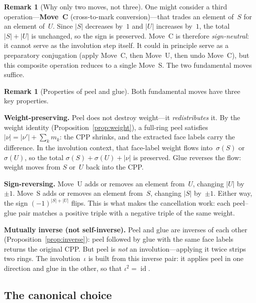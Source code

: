 \documentclass[11pt]{article}
\theoremstyle{plain}
\theoremstyle{definition}
\newtheorem{remark}[theorem]{Remark}
\begin{document}
\begin{remark}[Why only two moves, not three]
\label{rmk:two-not-three}
One might consider a third operation---\textbf{Move~C}
(cross-to-mark conversion)---that trades an element of~$S$ for an
element of~$U$.  Since $|S|$ decreases by~$1$ and $|U|$ increases
by~$1$, the total $|S| + |U|$ is unchanged, so the sign is
preserved.  Move~C is therefore \emph{sign-neutral}: it cannot
serve as the involution step itself.  It could in principle serve
as a preparatory conjugation (apply Move~C, then Move~U, then
undo Move~C), but this composite operation reduces to a single
Move~S\@.  The two fundamental moves suffice.
\end{remark}

\begin{remark}[Properties of peel and glue]
\label{rmk:peel-glue-properties}
Both fundamental moves have three key properties.

\smallskip\noindent
\textbf{Weight-preserving.}\;
Peel does not destroy weight---it \emph{redistributes} it.  By the
weight identity (Proposition~\ref{prop:weight}), a full-ring peel
satisfies $|\nu| = |\nu'| + \sum_k m_k$: the CPP shrinks, and the
extracted face labels carry the difference.  In the involution
context, that face-label weight flows into~$\sigma(S)$ or~$\sigma(U)$,
so the total $\sigma(S) + \sigma(U) + |\nu|$ is preserved.  Glue
reverses the flow: weight moves from $S$ or~$U$ back into the CPP\@.

\smallskip\noindent
\textbf{Sign-reversing.}\;
Move~U adds or removes an element from~$U$, changing $|U|$
by~$\pm 1$.  Move~S adds or removes an element from~$S$,
changing $|S|$ by~$\pm 1$.  Either way, the sign
$(-1)^{|S|+|U|}$ flips.  This is what makes the cancellation
work: each peel--glue pair matches a positive triple with a
negative triple of the same weight.

\smallskip\noindent
\textbf{Mutually inverse (not self-inverse).}\;
Peel and glue are inverses of each other
(Proposition~\ref{prop:inverse}): peel followed by glue with the
same face labels returns the original CPP\@.  But peel is
\emph{not} an involution---applying it twice strips two rings.
The involution~$\iota$ is built from this inverse pair: it applies
peel in one direction and glue in the other, so that
$\iota^2 = \operatorname{id}$.
\end{remark}

\subsection{The canonical choice}
\label{sec:canonical}
\end{document}
